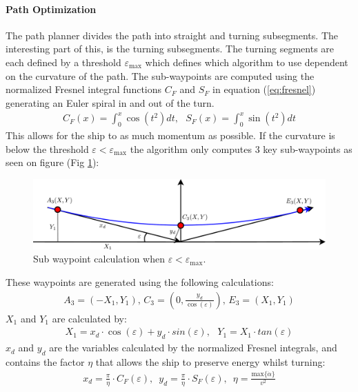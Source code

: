 \documentclass[a0,portrait]{a0poster}
\begin{document}
\begin{center}
{\paragraph{Path Optimization}
The path planner divides the path into straight and turning subsegments. The interesting part of this, is the turning subsegments. The turning segments are each defined by a threshold $\varepsilon_\text{max}$ which defines which algorithm to use dependent on the curvature of the path. The sub-waypoints are computed using the normalized Fresnel integral functions $C_F$ and $S_F$ in equation (\ref{eq:fresnel}) generating an Euler spiral in and out of the turn. 
\begin{align}
C_F(x) = \int_0^x \cos(t^2)dt,\,\,\,\,S_F(x) = \int_0^x \sin(t^2)dt
\label{eq:fresnel}
\end{align}
This allows for the ship to as much momentum as possible. If the curvature is below the threshold $\varepsilon < \varepsilon_ \text{max}$ the algorithm only computes 3 key sub-waypoints as seen on figure (Fig \ref{fig:3points}):
\begin{figure}
	\centering
	\includegraphics[width=0.99\threecolwidth]{img/3points.pdf}
  	\caption{Sub waypoint calculation when $\varepsilon < \varepsilon _\text{max}$.}
	\label{fig:3points}
\end{figure}
These waypoints are generated using the following calculations:
\begin{align}
A_\text{3} = (-X_1,Y_1),\, C_\text{3} = (0,\frac{y_d}{\cos(\varepsilon)}),\, E_\text{3} = (X_1,Y_1)
\end{align}
$X_1$ and $Y_1$ are calculated by:
\begin{align}
X_1 = x_d \cdot \cos(\varepsilon) + y_d \cdot sin(\varepsilon),\,\,\,\, Y_1 = X_1 \cdot tan(\varepsilon)
\end{align}
$x_d$ and $y_d$ are the variables calculated by the normalized Fresnel integrals, and contains the factor $\eta$ that allows the ship to preserve energy whilst turning:
\begin{align}
x_d = \frac{\pi}{\eta}\cdot C_F(\varepsilon),\,\,\, y_d = \frac{\pi}{\eta}\cdot S_F(\varepsilon),\,\,\, \eta = \frac{\text{max}\{\dot{\alpha}\}}{v^2}

\end{align}}
\end{center}
\end{document}
